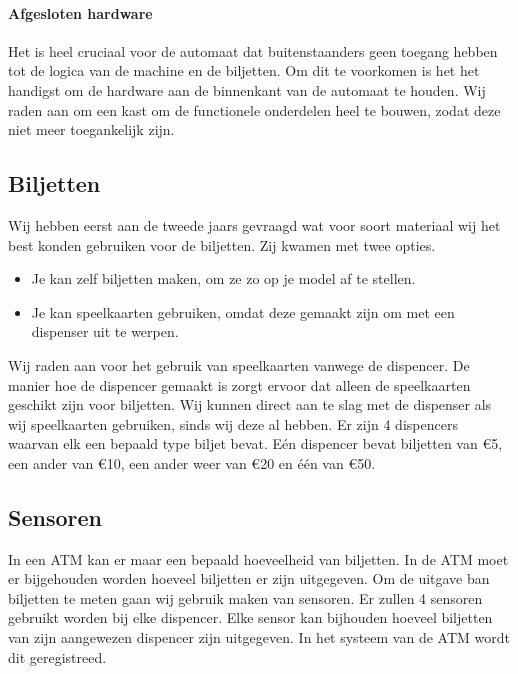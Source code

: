 \documentclass{article}
\begin{document}
\hfill

\centerline{  }

\paragraph{Afgesloten hardware}

Het is heel cruciaal voor de automaat dat buitenstaanders geen toegang hebben tot de logica van de machine en de biljetten.
Om dit te voorkomen is het het handigst om de hardware aan de binnenkant van de automaat te houden.
Wij raden aan om een kast om de functionele onderdelen heel te bouwen, zodat deze niet meer toegankelijk zijn.

\subsection{Biljetten}

Wij hebben eerst aan de tweede jaars gevraagd wat voor soort materiaal wij het best konden gebruiken voor de biljetten.
Zij kwamen met twee opties.
\begin{itemize}
\item Je kan zelf biljetten maken, om ze zo op je model af te stellen.
\item Je kan speelkaarten gebruiken, omdat deze gemaakt zijn om met een dispenser uit te werpen.
\end{itemize}

Wij raden aan voor het gebruik van speelkaarten vanwege de dispencer.
De manier hoe de dispencer gemaakt is zorgt ervoor dat alleen de speelkaarten geschikt zijn voor biljetten.
Wij kunnen direct aan te slag met de dispenser als wij speelkaarten gebruiken, sinds wij deze al hebben.
Er zijn 4 dispencers waarvan elk een bepaald type biljet bevat.
E\'en dispencer bevat biljetten van \euro{5},
een ander van \euro{10},
een ander weer van \euro{20} en \'e\'en van \euro{50}.

\newpage

\subsection{Sensoren}
In een ATM kan er maar een bepaald hoeveelheid van biljetten.
In de ATM moet er bijgehouden worden hoeveel biljetten er zijn uitgegeven.
Om de uitgave ban biljetten te meten gaan wij gebruik maken van sensoren.
Er zullen 4 sensoren gebruikt worden bij elke dispencer.
Elke sensor kan bijhouden hoeveel biljetten van zijn aangewezen dispencer zijn uitgegeven.
In het systeem van de ATM wordt dit geregistreed.
\end{document}
